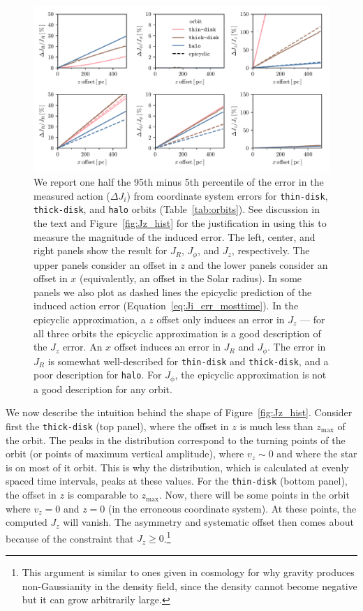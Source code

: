 \documentclass[twocolumn]{aastex62}
\newcommand{\thin}{\texttt{thin-disk}}
\newcommand{\thick}{\texttt{thick-disk}}
\newcommand{\halo}{\texttt{halo}}
\begin{document}
\begin{figure}[htb!]
\begin{center}
\includegraphics[width=\textwidth]{fig/schmactions_many_orbits.pdf}
\end{center}
\caption{We report one half the 95th minus 5th percentile of the error
in the measured action ($\Delta J_i$) from coordinate system errors for
\thin{}, \thick{}, and \halo{} orbits (Table~\ref{tab:orbits}). See discussion in the
text and Figure~\ref{fig:Jz_hist} for the justification in using this to measure the magnitude of the
induced error. The left, center, and right panels show the result for $J_R$,
$J_{\phi}$, and $J_z$, respectively. The upper panels consider an offset in
$z$ and the lower panels consider an offset in $x$ (equivalently, an offset in
the Solar radius). In some panels we also plot as dashed lines the epicyclic
prediction of the induced action error (Equation~\eqref{eq:Ji_err_mosttime}).
In the epicyclic approximation, a $z$ offset only induces an error in $J_z$
--- for all three orbits the epicyclic approximation is a good description of
the $J_z$ error. An $x$ offset induces an error in $J_R$ and $J_{\phi}$. The
error in $J_R$ is somewhat well-described for \thin{} and \thick{},
and a poor description for \halo{}. For $J_{\phi}$, the
epicyclic approximation is not a good description for any orbit.}
\label{fig:many_orbit_wrong_ref}
\end{figure}

We now describe the intuition behind the shape of Figure~\ref{fig:Jz_hist}.
Consider first the \thick{} (top panel), where the offset in $z$ is
much less than $z_{\text{max}}$ of the orbit. The peaks in the distribution
correspond to the turning points of the orbit (or points of maximum vertical
amplitude), where $v_z \sim 0$ and where the star is on most of it orbit. This
is why the distribution, which is calculated at evenly spaced time intervals, peaks at these values. For the \thin{}
(bottom panel), the offset in $z$ is comparable to $z_{\text{max}}$. Now,
there will be some points in the orbit where $v_z = 0$ and $z=0$ (in the
erroneous coordinate system). At these points, the computed $J_z$
will vanish. The asymmetry and systematic offset then comes about because of
the constraint that $J_z \geq 0$.\footnote{This argument is similar to ones given in
cosmology for why gravity produces non-Gaussianity in the density field, since
the density cannot become negative but it can grow arbitrarily large.}
\end{document}
